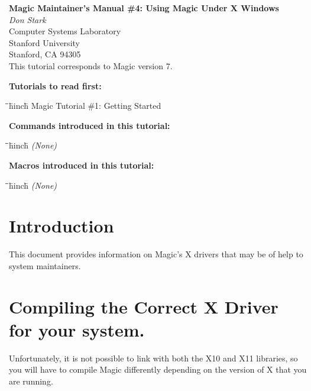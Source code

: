 \documentclass[letterpaper,twoside,12pt]{article}
\def\hinch{\hspace*{0.5in}}
\def\starti{\begin{center}\begin{tabbing}\hinch\=\hinch\=\hinch\=hinch\hinch\=\kill}
\def\endi{\end{tabbing}\end{center}}
\def\mytitle{Magic Maintainer's Manual \#4: Using Magic Under X Windows}
\begin{document}
\makeatletter
\newcommand{\ps@magic}{%
	\renewcommand{\@oddhead}{\mytitle\hfil\today}%
	\renewcommand{\@evenhead}{\today\hfil\mytitle}%
	\renewcommand{\@evenfoot}{\hfil\textrm{--{\thepage}--}\hfil}%
	\renewcommand{\@oddfoot}{\@evenfoot}}
\newcommand{\ps@mplain}{%
	\renewcommand{\@oddhead}{}%
	\renewcommand{\@evenhead}{}%
	\renewcommand{\@evenfoot}{\hfil\textrm{--{\thepage}--}\hfil}%
	\renewcommand{\@oddfoot}{\@evenfoot}}
\makeatother
\pagestyle{magic}
\thispagestyle{mplain}


\begin{center}
  {\bfseries \Large \mytitle} \\
  \vspace*{0.5in}
  {\itshape Don Stark} \\
  \vspace*{0.5in}
   Computer Systems Laboratory \\
   Stanford University \\
   Stanford, CA  94305 \\
  \vspace*{0.25in}
  This tutorial corresponds to Magic version 7. \\
\end{center}
\vspace*{0.5in}

{\noindent\bfseries\large Tutorials to read first:}
\starti
   \> Magic Tutorial  \#1: Getting Started
\endi

{\noindent\bfseries\large Commands introduced in this tutorial:}
\starti
   \> {\itshape (None)}
\endi

{\noindent\bfseries\large Macros introduced in this tutorial:}

\starti
   \> {\itshape (None)}
\endi
\section{Introduction}

This document provides information on Magic's X drivers that may be of help
to system maintainers.

\section{Compiling the Correct X Driver for your system.}

Unfortunately, it is not possible to link with both the X10 and X11
libraries, so you will have to compile Magic differently depending 
on the version of X that you are running.
\end{document}
